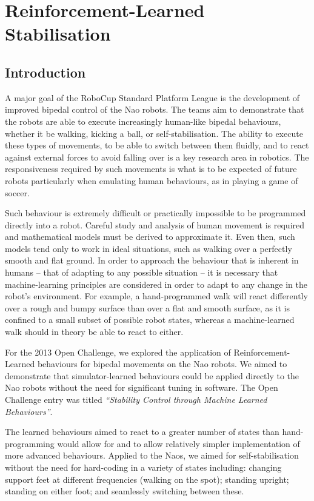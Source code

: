 \chapter{Reinforcement-Learned Stabilisation}
\label{chap:rl_walk}

\section{Introduction}

A major goal of the RoboCup Standard Platform League is the development of improved bipedal control of the Nao robots. The teams aim to demonstrate that the robots are able to execute increasingly human-like bipedal behaviours, whether it be walking, kicking a ball, or self-stabilisation. The ability to execute these types of movements, to be able to switch between them fluidly, and to react against external forces to avoid falling over is a key research area in robotics. The responsiveness required by such movements is what is to be expected of future robots particularly when emulating human behaviours, as in playing a game of soccer.

Such behaviour is extremely difficult or practically impossible to be programmed directly into a robot. Careful study and analysis of human movement is required and mathematical models must be derived to approximate it. Even then, such models tend only to work in ideal situations, such as walking over a perfectly smooth and flat ground. In order to approach the behaviour that is inherent in humans -- that of adapting to any possible situation -- it is necessary that machine-learning principles are considered in order to adapt to any change in the robot's environment. For example, a hand-programmed walk will react differently over a rough and bumpy surface than over a flat and smooth surface, as it is confined to a small subset of possible robot states, whereas a machine-learned walk should in theory be able to react to either.

For the 2013 Open Challenge, we explored the application of Reinforcement-Learned behaviours for bipedal movements on the Nao robots. We aimed to demonstrate that simulator-learned behaviours could be applied directly to the Nao robots without the need for significant tuning in software. The Open Challenge entry was titled \textit{``Stability Control through Machine Learned Behaviours''}\cite{openchallenge}.

The learned behaviours aimed to react to a greater number of states than hand-programming would allow for and to allow relatively simpler implementation of more advanced behaviours. Applied to the Naos, we aimed for self-stabilisation without the need for hard-coding in a variety of states including: changing support feet at different frequencies (walking on the spot); standing upright; standing on either foot; and seamlessly switching between these. 


